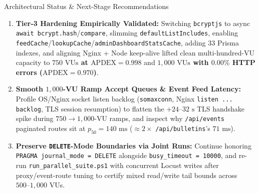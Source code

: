\documentclass[11pt,letterpaper]{article}
\begin{document}
\begin{calloutbox}[NavyPrimary]{Architectural Status \& Next-Stage Recommendations}
\begin{enumerate}
  \item \textbf{Tier-3 Hardening Empirically Validated:} Switching \texttt{bcryptjs} to async \texttt{await bcrypt.hash}/\texttt{compare}, slimming \texttt{defaultListIncludes}, enabling \texttt{feedCache}/\texttt{lookupCache}/\texttt{adminDashboardStatsCache}, adding $33$ Prisma indexes, and aligning Nginx + Node keep-alive lifted clean multi-hundred-VU capacity to \textbf{$750\text{ VUs}$ at $\text{APDEX} = 0.998$} and \textbf{$1{,}000\text{ VUs}$ with $0.00\%$ HTTP errors ($\text{APDEX} = 0.970$)}.
  \item \textbf{Smooth $1{,}000$-VU Ramp Accept Queues \& Event Feed Latency:} Profile OS/Nginx socket listen backlog (\texttt{somaxconn}, Nginx \texttt{listen ... backlog}, TLS session resumption) to flatten the $+24\text{--}32\text{ s}$ TLS handshake spike during $750\to 1{,}000$-VU ramps, and inspect why \texttt{/api/events} paginated routes sit at $p_{50} = 140\text{ ms}$ ($\approx 2\times$ \texttt{/api/bulletins}'s $71\text{ ms}$).
  \item \textbf{Preserve \texttt{DELETE}-Mode Boundaries via Joint Runs:} Continue honoring \texttt{PRAGMA journal\_mode = DELETE} alongside \texttt{busy\_timeout = 10000}, and re-run \texttt{run\_parallel\_suite.ps1} with concurrent Locust writes after proxy/event-route tuning to certify mixed read/write tail bounds across $500\text{--}1{,}000$ VUs.
\end{enumerate}
\end{calloutbox}
\end{document}
